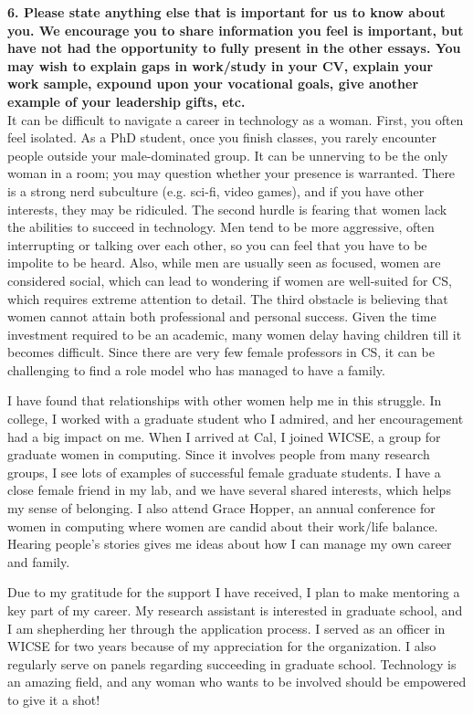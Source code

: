 \documentclass{article}
\begin{document}
\pagestyle{plain}

\noindent\textbf{6.  Please state anything else that is important for us to know about you. We encourage you to share information you feel is important, but have not had the opportunity to fully present in the other essays. You may wish to explain gaps in work/study in your CV, explain your work sample, expound upon your vocational goals, give another example of your leadership gifts, etc.}\\

It can be difficult to navigate a career in technology as a woman.
First, you often feel isolated.
As a PhD student, once you finish classes, you rarely encounter people outside your male-dominated group.
It can be unnerving to be the only woman in a room; you may question whether your presence is warranted.
There is a strong nerd subculture (e.g. sci-fi, video games), and if you have other interests, they may be ridiculed.
The second hurdle is fearing that women lack the abilities to succeed in technology.
Men tend to be more aggressive, often interrupting or talking over each other, so you can feel that you have to be impolite to be heard.
Also, while men are usually seen as focused, women are considered social, which can lead to wondering if women are well-suited for CS, which requires extreme attention to detail.
The third obstacle is believing that women cannot attain both professional and personal success.
Given the time investment required to be an academic, many women delay having children till it becomes difficult.
Since there are very few female professors in CS, it can be challenging to find a role model who has managed to have a family.

I have found that relationships with other women help me in this struggle.
In college, I worked with a graduate student who I admired, and her encouragement had a big impact on me.
When I arrived at Cal, I joined WICSE, a group for graduate women in computing.
Since it involves people from many research groups, I see lots of examples of successful female graduate students.
I have a close female friend in my lab, and we have several shared interests, which helps my sense of belonging.
I also attend Grace Hopper, an annual conference for women in computing where women are candid about their work/life balance.
Hearing people's stories gives me ideas about how I can manage my own career and family.

Due to my gratitude for the support I have received, I plan to make mentoring a key part of my career.
My research assistant is interested in graduate school, and I am shepherding her through the application process.
I served as an officer in WICSE for two years because of my appreciation for the organization.
I also regularly serve on panels regarding succeeding in graduate school.
Technology is an amazing field, and any woman who wants to be involved should be empowered to give it a shot!
\end{document}

